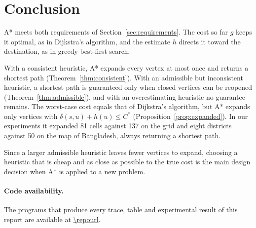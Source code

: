 \section{Conclusion}\label{sec:conclusion}

A* meets both requirements of Section~\ref{sec:requirements}. The cost so far
$g$ keeps it optimal, as in Dijkstra's algorithm, and the estimate $h$ directs
it toward the destination, as in greedy best-first search.

With a consistent heuristic, A* expands every vertex at most once and returns a
shortest path (Theorem~\ref{thm:consistent}). With an admissible but
inconsistent heuristic, a shortest path is guaranteed only when closed vertices
can be reopened (Theorem~\ref{thm:admissible}), and with an overestimating
heuristic no guarantee remains. The worst-case cost equals that of Dijkstra's
algorithm, but A* expands only vertices with $\delta(s,u) + h(u) \le C^{*}$
(Proposition~\ref{prop:expanded}). In our experiments it expanded 81 cells
against 137 on the grid and eight districts against 50 on the map of Bangladesh,
always returning a shortest path.

Since a larger admissible heuristic leaves fewer vertices to expand, choosing a
heuristic that is cheap and as close as possible to the true cost is the main
design decision when A* is applied to a new problem.

\paragraph{Code availability.} The programs that produce every trace, table and
experimental result of this report are available at \url{\repourl}.
